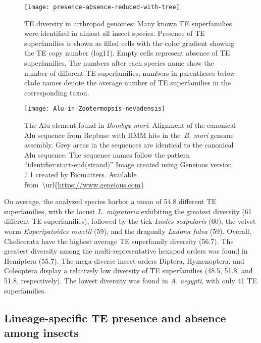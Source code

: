 \begin{figure}[h!]
\begin{center}
\texttt{[image: presence-absence-reduced-with-tree]}
\caption[TE diversity in arthropod genomes]{{TE diversity in arthropod genomes: Many known TE superfamilies were
identified in almost all insect species. Presence of TE superfamilies is
shown as filled cells with the color gradient showing the TE copy number
(log11). Empty cells represent absence of TE superfamilies. The numbers
after each species name show the number of different TE superfamilies;
numbers in parentheses below clade names denote the average number of TE
superfamilies in the corresponding taxon.%
}}
\end{center}
\end{figure}

\begin{figure}[h!]
\begin{center}
\texttt{[image: Alu-in-Zootermopsis-nevadensis]}
\caption[The Alu element found in \emph{Bombyx mori}]{{The Alu element
found in \emph{Bombyx mori}: Alignment of the canonical Alu sequence
from Repbase with HMM hits in the~\emph{B. mori} genome assembly. Grey
areas in the sequences are identical to the canonical Alu sequence. The
sequence names follow the pattern ``identifier:start-end(strand)'' Image
created using Geneious version 7.1 created by Biomatters. Available
from~\textbackslash{}url\{\url{https://www.geneious.com}\}
{\label{169157}}%
}}
\end{center}
\end{figure}

On average, the analyzed species harbor a mean of 54.8 different TE
superfamilies, with the locust \emph{L. migratoria} exhibiting the
greatest diversity (61 different TE superfamilies), followed by the tick
\emph{Ixodes scapularis} (60), the velvet worm \emph{Euperipatoides
rowelli} (59), and the dragonfly \emph{Ladona fulva} (59). Overall,
Chelicerata have the highest average TE superfamily diversity (56.7).
The greatest diversity among the multi-representative hexapod orders was
found in Hemiptera (55.7). The mega-diverse insect orders Diptera,
Hymenoptera, and Coleoptera display a relatively low diversity of TE
superfamilies (48.5, 51.8, and 51.8, respectively). The lowest diversity
was found in \emph{A. aegypti}, with only 41 TE superfamilies.

\subsection{Lineage-specific TE presence and absence among
insects}\label{lineage-specific-te-presence-and-absence-among-insects}

